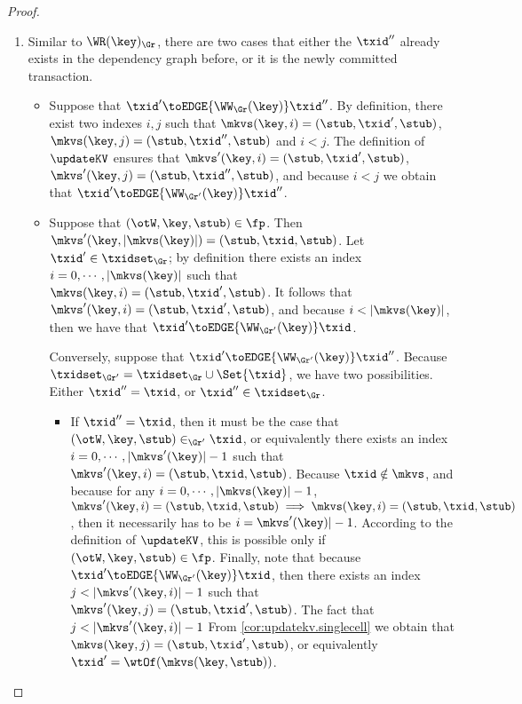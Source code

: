 \begin{proof}
\begin{enumerate}
\item 
Similar to \( \WR(\key)_{\Gr} \), there are two cases that either the \( \txid'' \) already exists in the dependency graph before,
or it is the newly committed transaction.
\begin{itemize}
\item Suppose that $\txid' \toEDGE{\WW_{\Gr}(\key)} \txid''$. 
By definition, there exist two indexes $i, j$ such that 
$\mkvs(\key, i) = (\stub, \txid', \stub)$, $\mkvs(\key, j) = (\stub, \txid'', \stub)$ 
and $i < j$. The definition of $\updateKV$ ensures that 
$\mkvs'(\key, i) = (\stub, \txid', \stub)$, $\mkvs'(\key, j) = (\stub, \txid'', \stub)$, 
and because $i < j$ we obtain that $\txid' \toEDGE{\WW_{\Gr'}(\key)} \txid''$. 

\item Suppose that $(\otW, \key, \stub) \in \fp$. Then $\mkvs'(\key, \lvert \mkvs(\key) \rvert) = (\stub, \txid, \stub)$.
Let $\txid' \in \txidset_{\Gr}$; by definition there exists an index $i = 0,\cdots, \lvert \mkvs(\key) \rvert$ 
such that $\mkvs(\key, i) = (\stub, \txid', \stub)$. It follows that $\mkvs'(\key, i) = (\stub, \txid', \stub)$, and 
because $i < \lvert \mkvs(\key) \rvert$, then we have that $\txid' \toEDGE{\WW_{\Gr'}(\key)} \txid$. 

Conversely, suppose that $\txid' \toEDGE{\WW_{\Gr'}(\key)} \txid''$. Because 
$\txidset_{\Gr'} = \txidset_{\Gr} \cup \Set{ \txid }$, we have two possibilities. Either $\txid'' = \txid$, 
or $\txid'' \in \txidset_{\Gr}$. 

\begin{itemize}
\item If $\txid'' = \txid$, then it must be the case that $(\otW, \key, \stub) \in_{\Gr'} \txid$, 
or equivalently there exists an index $i=0,\cdots, \lvert \mkvs'(\key) \rvert -1 $ such that 
$\mkvs'(\key, i) = (\stub, \txid, \stub)$. Because $\txid \notin \mkvs$, and because for any 
$i = 0, \cdots, \lvert \mkvs(\key) \rvert - 1$, $\mkvs'(\key, i) = (\stub, \txid, \stub) \implies 
\mkvs(\key, i) = (\stub, \txid, \stub)$, then it necessarily has to be $i = \mkvs'(\key) \rvert - 1$. 
According to the definition of $\updateKV$, this is possible only if $(\otW,\key, \stub) \in \fp$. 
Finally, note that because $\txid' \toEDGE{\WW_{\Gr'}(\key)} \txid$, then 
there exists an index $j < \lvert \mkvs'(\key, i) \rvert - 1$ such that 
$\mkvs'(\key, j) = (\stub, \txid' ,\stub)$. The fact that $j < \lvert \mkvs'(\key, i) \rvert - 1$ 
From \cref{cor:updatekv.singlecell} we obtain that $\mkvs(\key, j) = (\stub, \txid', \stub)$, 
or equivalently $\txid' = \wtOf(\mkvs(\key, \stub))$. 


\end{itemize}
\end{itemize}
\end{enumerate}
\end{proof}
